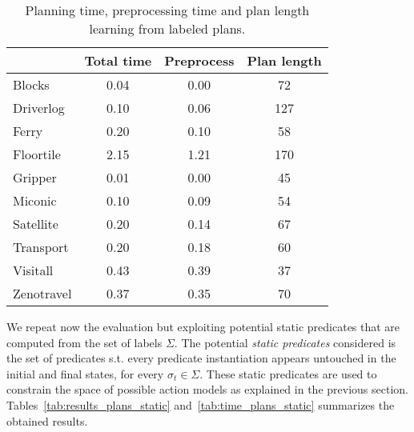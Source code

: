 \documentclass[letterpaper]{article} %
\begin{document}
\begin{table}
\begin{footnotesize}
	\begin{center}
		\begin{tabular}{l|c|c|c|}			
			 & Total time & Preprocess & Plan length  \\
			\hline
			Blocks & 0.04 & 0.00 & 72 \\
			Driverlog & 0.10 & 0.06 & 127 \\
			Ferry & 0.20 & 0.10 & 58 \\
			Floortile & 2.15 & 1.21 & 170 \\
			Gripper & 0.01 & 0.00 & 45 \\
			Miconic & 0.10 & 0.09 & 54 \\
			Satellite & 0.20 & 0.14 & 67 \\
			Transport & 0.20 & 0.18 & 60 \\
			Visitall & 0.43 & 0.39 & 37 \\
			Zenotravel & 0.37 & 0.35 & 70			
		\end{tabular}
	\end{center}
        \end{footnotesize}
	\caption{\small Planning time, preprocessing time and plan length learning from labeled plans.}
	\label{tab:time_plans}	
\end{table}

We repeat now the evaluation but exploiting potential static predicates that are computed from the set of labels $\Sigma$. The potential {\em static predicates} considered is the set of predicates s.t. every predicate instantiation appears untouched in the initial and final states, for every $\sigma_t\in\Sigma$. These static predicates are used to constrain the space of possible action models as explained in the previous section.  Tables~\ref{tab:results_plans_static} and~\ref{tab:time_plans_static} summarizes the obtained results.	
\end{document}
